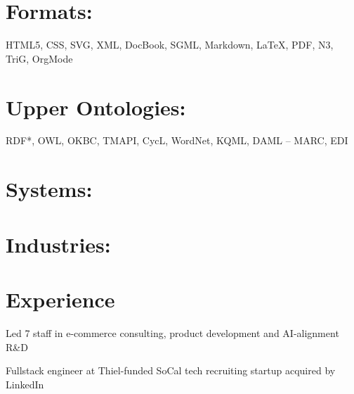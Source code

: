 \documentclass[line,margin,hidelinks]{res}
\begin{document}
\section{Formats:}
\begin{par}
  \small{HTML5, CSS, SVG, XML, DocBook, SGML, Markdown, \LaTeX, PDF, N3, TriG, OrgMode}
\end{par}

\section{\footnotesize{Upper Ontologies:}}
\begin{par}
  RDF*, OWL, OKBC, TMAPI, CycL, WordNet, KQML, DAML -- MARC, EDI
\end{par}


% 


\section{Systems:}


\section{Industries:}



\section{Experience}


\begin{position}
Led 7 staff in e-commerce consulting, product development and AI-alignment R\&D
\end{position}

\parskip=3.5pt %


\begin{position}
Fullstack engineer at Thiel-funded SoCal tech recruiting startup acquired by LinkedIn
\end{position}
\end{document}
